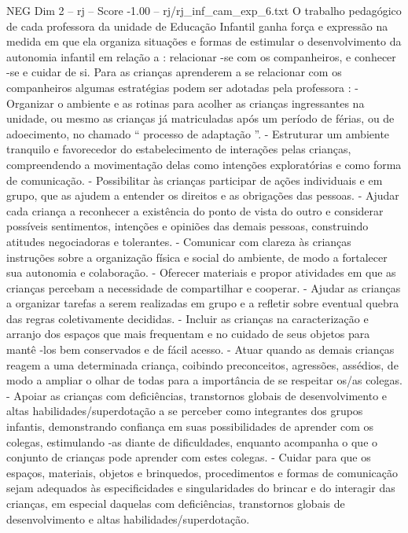 \begin{textsample}{NEG Dim 2 – rj – Score -1.00 – rj/rj\_inf\_cam\_exp\_6.txt}  \label{ex:f2_neg_054}
O trabalho pedagógico de cada professora da unidade de Educação Infantil ganha força e expressão na medida em que ela organiza situações e formas de estimular o desenvolvimento da autonomia infantil em relação a : relacionar -se com os companheiros, e conhecer -se e cuidar de si.
Para as crianças aprenderem a se relacionar com os companheiros algumas estratégias podem ser adotadas pela professora : - Organizar o ambiente e as rotinas para acolher as crianças ingressantes na unidade, ou mesmo as crianças já matriculadas após um período de férias, ou de adoecimento, no chamado “ processo de adaptação ”. - Estruturar um ambiente tranquilo e favorecedor do estabelecimento de interações pelas crianças, compreendendo a movimentação delas como intenções exploratórias e como forma de comunicação. - Possibilitar às crianças participar de ações individuais e em grupo, que as ajudem a entender os direitos e as obrigações das pessoas. - Ajudar cada criança a reconhecer a existência do ponto de vista do outro e considerar possíveis sentimentos, intenções e opiniões das demais pessoas, construindo atitudes negociadoras e tolerantes. - Comunicar com clareza às crianças instruções sobre a organização física e social do ambiente, de modo a fortalecer sua autonomia e colaboração. - Oferecer materiais e propor atividades em que as crianças percebam a necessidade de compartilhar e cooperar. - Ajudar as crianças a organizar tarefas a serem realizadas em grupo e a refletir sobre eventual quebra das regras coletivamente decididas. - Incluir as crianças na caracterização e arranjo dos espaços que mais frequentam e no cuidado de seus objetos para mantê -los bem conservados e de fácil acesso. - Atuar quando as demais crianças reagem a uma determinada criança, coibindo preconceitos, agressões, assédios, de modo a ampliar o olhar de todas para a importância de se respeitar os/as colegas. - Apoiar as crianças com deficiências, transtornos globais de desenvolvimento e altas habilidades/superdotação a se perceber como integrantes dos grupos infantis, demonstrando confiança em suas possibilidades de aprender com os colegas, estimulando -as diante de dificuldades, enquanto acompanha o que o conjunto de crianças pode aprender com estes colegas. - Cuidar para que os espaços, materiais, objetos e brinquedos, procedimentos e formas de comunicação sejam adequados às especificidades e singularidades do brincar e do interagir das crianças, em especial daquelas com deficiências, transtornos globais de desenvolvimento e altas habilidades/superdotação.

\end{textsample}
